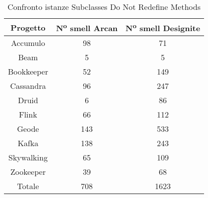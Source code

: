         \begin{table}[h]
            \centering
            \begin{tabular}{|c|c|c|}
                \hline
                \textbf{Progetto} & \textbf{N\textsuperscript{o} smell Arcan} & \textbf{N\textsuperscript{o} smell Designite} \\
                \hline
                Accumulo & 98 & 71 \\
                Beam & 5 & 5 \\
                Bookkeeper & 52 & 149\\
                Cassandra & 96 & 247\\
                Druid & 6 & 86\\
                Flink & 66 & 112\\
                Geode & 143 & 533\\
                Kafka & 138 & 243\\
                Skywalking & 65 & 109\\
                Zookeeper & 39 & 68\\
                \hline
                Totale & 708 & 1623 \\
                \hline
            \end{tabular}
            \caption{Confronto istanze Subclasses Do Not Redefine Methods}
            \label{tab:caption}
        \end{table}
